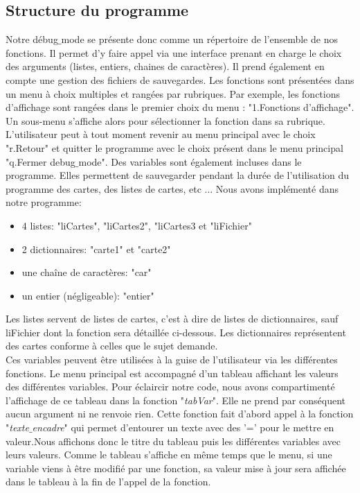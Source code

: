 \documentclass[10pt,a4paper,french,titlepage]{article}
\theoremstyle{definition}
\begin{document}
\subsection{Structure du programme}
Notre débug$\_$mode se présente donc comme un répertoire de l'ensemble de nos fonctions. Il permet d'y faire appel via une interface prenant en charge le choix des arguments (listes, entiers, chaines de caractères). Il prend également en compte une gestion des fichiers de sauvegardes.  Les fonctions sont présentées dans un menu à choix multiples et rangées par rubriques. Par exemple, les fonctions d'affichage sont rangées dans le premier choix du menu : "1.Fonctions d'affichage". Un sous-menu s'affiche alors pour sélectionner la fonction dans sa rubrique. L'utilisateur peut à tout moment revenir au menu principal avec le choix "r.Retour" et quitter le programme avec le choix présent dans le menu principal "q.Fermer debug$\_$mode". Des variables sont également incluses dans le programme. Elles permettent de sauvegarder pendant la durée de l'utilisation du programme des cartes, des listes
de cartes, etc ... Nous avons implémenté dans notre programme:
\begin{itemize}
\item 4 listes: "liCartes", "liCartes2", "liCartes3 et "liFichier"\\
\item 2 dictionnaires: "carte1" et "carte2"\\
\item une chaîne de caractères: "car"\\
\item un entier (négligeable): "entier"\\
\end{itemize}
Les listes servent de listes de cartes, c'est à dire de listes de dictionnaires, sauf liFichier dont la fonction sera détaillée ci-dessous. Les dictionnaires représentent des cartes conforme à celles que le sujet demande. \\
Ces variables peuvent être utilisées à la guise de l'utilisateur via les différentes fonctions. Le menu principal est accompagné d'un tableau affichant les valeurs des 
différentes variables. Pour éclaircir notre code, nous avons compartimenté l'affichage de ce tableau dans la fonction "\textit{tabVar}". Elle ne prend par conséquent aucun
argument ni ne renvoie rien. Cette fonction fait d'abord appel à la fonction "\textit{texte$\_$encadre}" qui permet d'entourer un texte avec des '=' pour le mettre en valeur.Nous affichons donc le titre du tableau puis les différentes variables avec leurs valeurs. Comme le tableau s'affiche en même temps que le menu, si une variable viens à être modifié par une fonction, sa valeur mise à jour sera affichée dans le tableau à la fin de l'appel de la fonction.
\end{document}
